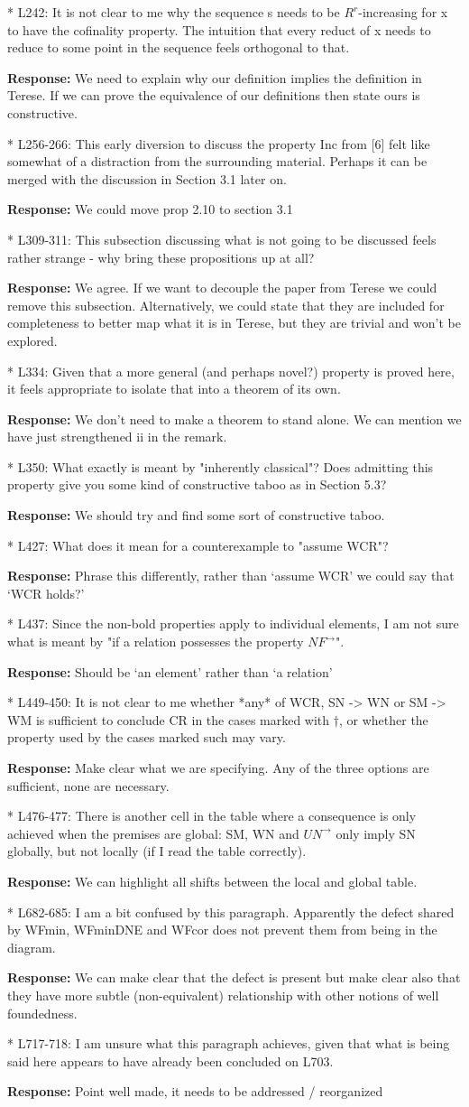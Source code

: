\documentclass[11pt]{article}
\newcommand{\res}[1]{\par\noindent\textbf{Response:} #1\par}
\begin{document}
* L242: It is not clear to me why the sequence s needs to be $R^r$-increasing
for x to have the cofinality property. The intuition that every reduct of
x needs to reduce to some point in the sequence feels orthogonal to that.
\res{We need to explain why our definition implies the definition in Terese. If we can prove the equivalence of our definitions then state ours is constructive. }
* L256-266: This early diversion to discuss the property Inc from [6] felt like
somewhat of a distraction from the surrounding material. Perhaps it can be
merged with the discussion in Section 3.1 later on.
\res{We could move prop 2.10 to section 3.1}
* L309-311: This subsection discussing what is not going to be discussed
feels rather strange - why bring these propositions up at all?
\res{We agree. If we want to decouple the paper from Terese we could remove this subsection. Alternatively, we could state that they are included for completeness to better map what it is in Terese, but they are trivial and won't be explored.}
* L334: Given that a more general (and perhaps novel?) property is proved here,
it feels appropriate to isolate that into a theorem of its own.
\res{We don't need to make a theorem to stand alone. We can mention we have just strengthened ii in the remark.}
* L350: What exactly is meant by "inherently classical"? Does admitting this
property give you some kind of constructive taboo as in Section 5.3?
\res{We should try and find some sort of constructive taboo.}
* L427: What does it mean for a counterexample to "assume WCR"?
\res{Phrase this differently, rather than `assume WCR' we could say that `WCR holds?'}
* L437: Since the non-bold properties apply to individual elements, I am not
sure what is meant by "if a relation possesses the property $NF^\rightarrow$".
\res{Should be `an element' rather than `a relation'}
* L449-450: It is not clear to me whether *any* of WCR, SN -> WN or SM -> WM
is sufficient to conclude CR in the cases marked with $\dagger$, or whether
the property used by the cases marked such may vary.
\res{Make clear what we are specifying. Any of the three options are sufficient, none are necessary.}
* L476-477: There is another cell in the table where a consequence is only
achieved when the premises are global: SM, WN and $UN^\rightarrow$ only imply
SN globally, but not locally (if I read the table correctly).
\res{We can highlight all shifts between the local and global table.}
* L682-685: I am a bit confused by this paragraph. Apparently the defect shared
by WFmin, WFminDNE and WFcor does not prevent them from being in the diagram.
\res{We can make clear that the defect is present but make clear also that they have more subtle (non-equivalent) relationship with other notions of well foundedness.}
* L717-718: I am unsure what this paragraph achieves, given that what is being
said here appears to have already been concluded on L703.
\res{Point well made, it needs to be addressed / reorganized}
\end{document}
